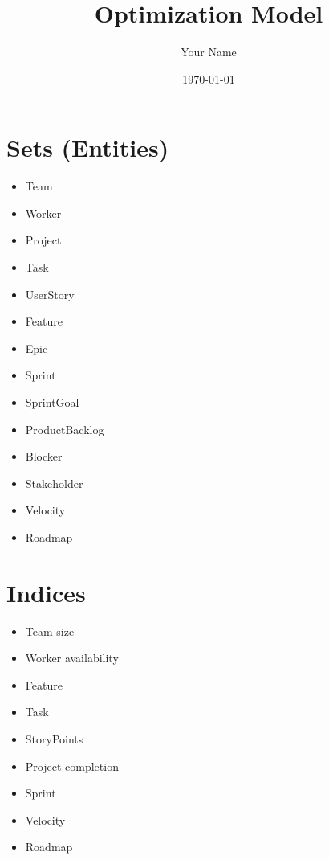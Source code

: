 \documentclass{article}
\title{Optimization Model}
\author{Your Name}
\date{\today}
\begin{document}
\maketitle
\tableofcontents

\section{Sets (Entities)}
\begin{itemize}
    \item Team
    \item Worker
    \item Project
    \item Task
    \item UserStory
    \item Feature
    \item Epic
    \item Sprint
    \item SprintGoal
    \item ProductBacklog
    \item Blocker
    \item Stakeholder
    \item Velocity
    \item Roadmap
\end{itemize}

\section{Indices}
\begin{itemize}
    \item Team size
    \item Worker availability
    \item Feature
    \item Task
    \item StoryPoints
    \item Project completion
    \item Sprint
    \item Velocity
    \item Roadmap
\end{itemize}
\end{document}
